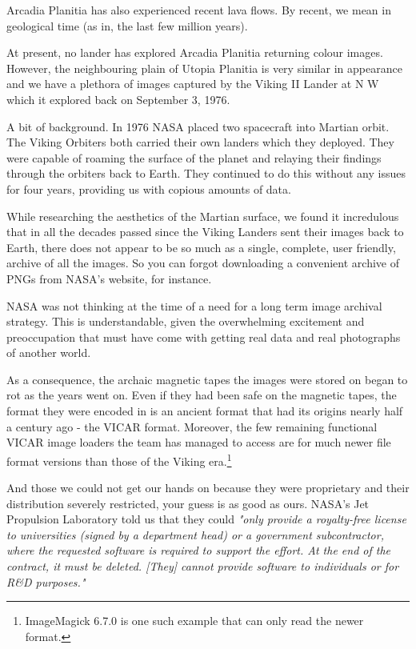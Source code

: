 Arcadia Planitia has also experienced recent lava flows. By recent, we mean in geological time (as in, the last few million years).


At present, no lander has explored Arcadia Planitia returning colour images. However, the neighbouring plain of Utopia Planitia is very similar in appearance and we have a plethora of images captured by the Viking II Lander at N W which it explored back on September 3, 1976.

A bit of background. In 1976 NASA placed two spacecraft into Martian orbit. The Viking Orbiters both carried their own landers which they deployed. They were capable of roaming the surface of the planet and relaying their findings through the orbiters back to Earth. They continued to do this without any issues for four years, providing us with copious amounts of data. 


While researching the aesthetics of the Martian surface, we found it incredulous that in all the decades passed since the Viking Landers sent their images back to Earth, there does not appear to be so much as a single, complete, user friendly, archive of all the images. So you can forgot downloading a convenient archive of PNGs from NASA's website, for instance.

NASA was not thinking at the time of a need for a long term image archival strategy. This is understandable, given the overwhelming excitement and preoccupation that must have come with getting real data and real photographs of another world.

As a consequence, the archaic magnetic tapes the images were stored on began to rot as the years went on. Even if they had been safe on the magnetic tapes, the format they were encoded in is an ancient format that had its origins nearly half a century ago - the VICAR format. Moreover, the few remaining functional VICAR image loaders the team has managed to access are for much newer file format versions than those of the Viking era.\footnote{ImageMagick 6.7.0 is one such example that can only read the newer format.}

And those we could not get our hands on because they were proprietary and their distribution severely restricted, your guess is as good as ours. NASA's Jet Propulsion Laboratory told us that they could {\it "only provide a royalty-free license to universities (signed by a department head) or a government subcontractor, where the requested software is required to support the effort. At the end of the contract, it must be deleted. [They] cannot provide software to individuals or for R&D purposes."}

